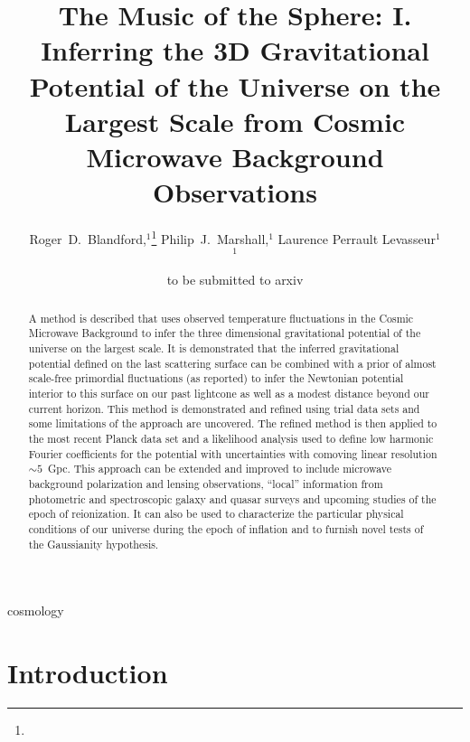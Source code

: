 \documentclass[useAMS,usenatbib,a4paper]{mn2e}
\title[The 3D Potential of the Universe from CMB Data]
{The Music of the Sphere: I. Inferring the 3D Gravitational Potential
of the Universe on the Largest Scale from Cosmic Microwave Background
Observations}
\author[Blandford et al.]{%
    Roger~D.~Blandford,$^{1}$\thanks{\rdbemail}
    Philip~J.~Marshall,$^{1}$
    Laurence Perrault Levasseur$^{1}$
    \medskip\\
    $^1$\kipac
}
\begin{document}
\date{to be submitted to arxiv}
\pagerange{\pageref{firstpage}--\pageref{lastpage}}

\maketitle

\label{firstpage}
\begin{abstract}
A method is described that uses observed temperature fluctuations in
the Cosmic Microwave Background to infer the three dimensional
gravitational potential of the universe on the largest scale. It is
demonstrated that the inferred gravitational potential defined on the
last scattering surface can be combined with a prior of almost
scale-free primordial fluctuations (as reported) to infer the
Newtonian potential interior to this surface on our past lightcone as
well as a modest distance beyond our current horizon. This method is
demonstrated and refined using  trial data sets and some limitations
of the approach are uncovered. The refined method is then applied to
the most recent Planck data set and a likelihood analysis used to
define low harmonic Fourier coefficients for the potential with
uncertainties with comoving linear resolution $\sim5$~Gpc. This
approach can be extended and improved to include microwave background
polarization and lensing observations, ``local'' information from
photometric and spectroscopic galaxy and quasar surveys and upcoming
studies of the epoch of reionization. It can also be used to
characterize the particular physical conditions of our universe during
the epoch of inflation and to furnish novel tests of the Gaussianity
hypothesis.
\end{abstract}
\begin{keywords}
  cosmology
\end{keywords}
\setcounter{footnote}{1}

\section{Introduction}
\end{document}
